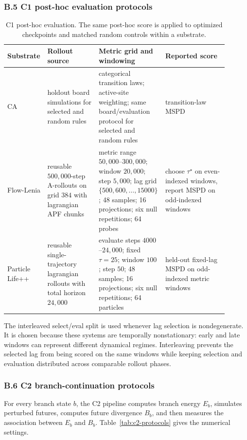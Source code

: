 \subsubsection*{B.5 C1 post-hoc evaluation protocols}

\begin{table}[H]
\centering
\scriptsize
\begin{tabular}{p{0.15\linewidth}p{0.23\linewidth}p{0.24\linewidth}p{0.28\linewidth}}
\toprule
Substrate & Rollout source & Metric grid and windowing & Reported score \\
\midrule
CA & holdout board simulations for selected and random rules & categorical transition laws; active-site weighting; same board/evaluation protocol for selected and random rules & transition-law MSPD \\
Flow-Lenia & reusable $500{,}000$-step A-rollouts on grid $384$ with lagrangian APF chunks & metric range $50{,}000$--$300{,}000$; window $20{,}000$; step $5{,}000$; lag grid $\{500,600,\ldots,15000\}$; 48 samples; 16 projections; six null repetitions; 64 probes & choose $\tau^\star$ on even-indexed windows, report MSPD on odd-indexed windows \\
Particle Life++ & reusable single-trajectory lagrangian rollouts with total horizon $24{,}000$ & evaluate steps $4000$--$24{,}000$; fixed $\tau=25$; window $100$; step $50$; 48 samples; 16 projections; six null repetitions; 64 particles & held-out fixed-lag MSPD on odd-indexed metric windows \\
\bottomrule
\end{tabular}
\caption{C1 post-hoc evaluation.  The same post-hoc score is applied to optimized checkpoints and matched random controls within a substrate.}
\label{tab:c1-posthoc}
\end{table}
\FloatBarrier

The interleaved select/eval split is used whenever lag selection is nondegenerate.  It is chosen because these systems are temporally nonstationary: early and late windows can represent different dynamical regimes.  Interleaving prevents the selected lag from being scored on the same windows while keeping selection and evaluation distributed across comparable rollout phases.

\subsubsection*{B.6 C2 branch-continuation protocols}

For every branch state $b$, the C2 pipeline computes branch energy $E_b$, simulates perturbed futures, computes future divergence $B_b$, and then measures the association between $E_b$ and $B_b$.  Table~\ref{tab:c2-protocols} gives the numerical settings.

